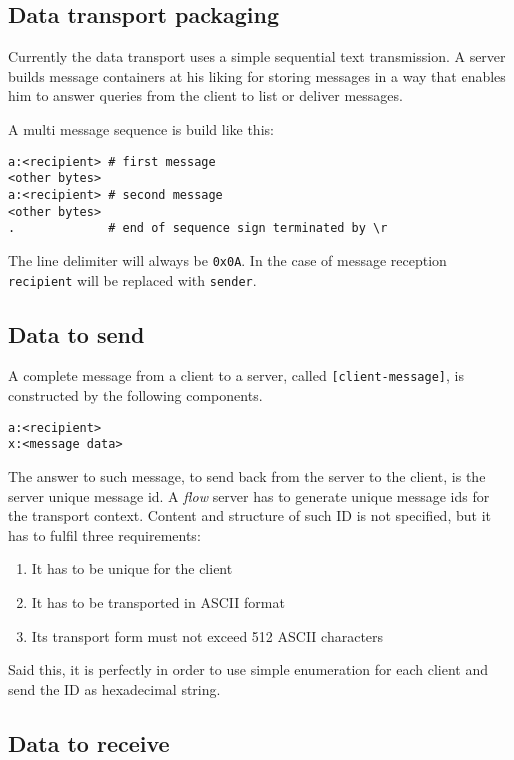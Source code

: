 \documentclass[twoside,a4paper,english,12pt,authoryear,openright]{book}
\newcommand{\flow}{\textit{flow} }
\begin{document}
\subsection{Data transport packaging}

Currently the data transport uses a simple sequential text transmission. A server builds message containers at his liking for storing messages in a way that enables him to answer queries from the client to list or deliver messages.

A multi message sequence is build like this:

\begin{lstlisting}
a:<recipient> # first message
<other bytes>
a:<recipient> # second message
<other bytes>
.             # end of sequence sign terminated by \r
\end{lstlisting}

The line delimiter will always be \texttt{0x0A}. In the case of message reception \texttt{recipient} will be replaced with \texttt{sender}.


\subsection{Data to send}

A complete message from a client to a server, called \texttt{[client-message]}, is constructed by the following components.

\begin{lstlisting}
a:<recipient>
x:<message data>
\end{lstlisting}

The answer to such message, to send back from the server to the client, is the server unique message id. A \flow server has to generate unique message ids for the transport context. Content and structure of such ID is not specified, but it has to fulfil three requirements:

\begin{enumerate}
\item{It has to be unique for the client}
\item{It has to be transported in ASCII format}
\item{Its transport form must not exceed 512 ASCII characters}
\end{enumerate}

Said this, it is perfectly in order to use simple enumeration for each client and send the ID as hexadecimal string.


\subsection{Data to receive}
\end{document}
